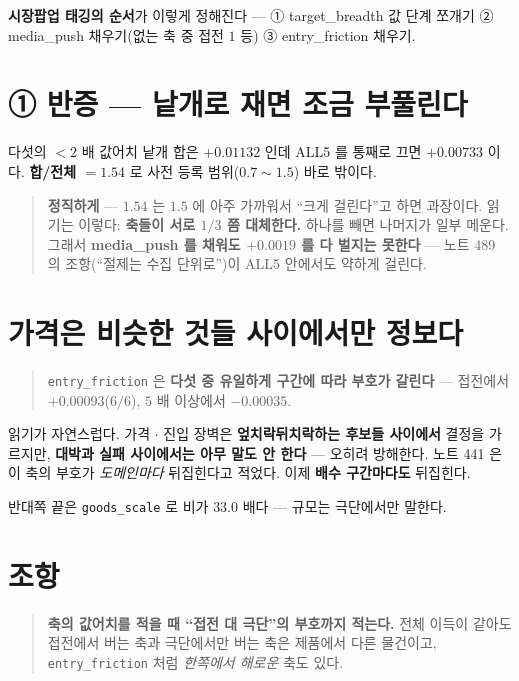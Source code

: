\documentclass[11pt]{article}
\begin{document}
\textbf{시장팝업 태깅의 순서}가 이렇게 정해진다 --- ① target\_breadth 값 단계
쪼개기 ② media\_push 채우기(없는 축 중 접전 $1$ 등) ③ entry\_friction 채우기.

\section{① 반증 --- 낱개로 재면 조금 부풀린다}

다섯의 $<2$ 배 값어치 낱개 합은 $+0.01132$ 인데 ALL5 를 통째로 끄면
$+0.00733$ 이다. \textbf{합/전체 $= 1.54$} 로 사전 등록 범위($0.7\!\sim\!1.5$)
바로 밖이다.

\begin{quote}
\textbf{정직하게} --- $1.54$ 는 $1.5$ 에 아주 가까워서 ``크게 걸린다''고 하면
과장이다. 읽기는 이렇다: \textbf{축들이 서로 $1/3$ 쯤 대체한다.} 하나를 빼면
나머지가 일부 메운다. 그래서 \textbf{media\_push 를 채워도 $+0.0019$ 를 다 벌지는
못한다} --- 노트 489 의 조항(``절제는 수집 단위로'')이 ALL5 안에서도 약하게
걸린다.
\end{quote}

\section{가격은 비슷한 것들 사이에서만 정보다}

\begin{quote}
\texttt{entry\_friction} 은 \textbf{다섯 중 유일하게 구간에 따라 부호가 갈린다}
--- 접전에서 $+0.00093$($6/6$), $5$ 배 이상에서 $\mathbf{-0.00035}$.
\end{quote}

읽기가 자연스럽다. 가격 $\cdot$ 진입 장벽은 \textbf{엎치락뒤치락하는 후보들
사이에서} 결정을 가르지만, \textbf{대박과 실패 사이에서는 아무 말도 안 한다}
--- 오히려 방해한다. 노트 441 은 이 축의 부호가 \emph{도메인마다} 뒤집힌다고
적었다. 이제 \textbf{배수 구간마다도} 뒤집힌다.

반대쪽 끝은 \texttt{goods\_scale} 로 비가 $\mathbf{33.0}$ 배다 --- 규모는
극단에서만 말한다.

\section*{조항}

\begin{quote}
\textbf{축의 값어치를 적을 때 ``접전 대 극단''의 부호까지 적는다.} 전체 이득이
같아도 접전에서 버는 축과 극단에서만 버는 축은 제품에서 다른 물건이고,
\texttt{entry\_friction} 처럼 \emph{한쪽에서 해로운} 축도 있다.
\end{quote}
\end{document}
